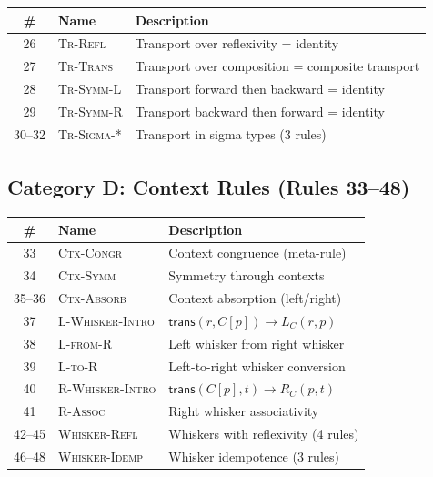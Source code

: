 \documentclass[manuscript]{BSLstyle}
\newcommand{\trans}{\mathsf{trans}}
\begin{document}
\begin{center}
\renewcommand{\arraystretch}{1.4}
\small
\begin{tabular}{clp{7cm}}
\toprule
\# & \textbf{Name} & \textbf{Description} \\
\midrule
26 & \textsc{Tr-Refl} & Transport over reflexivity = identity \\
27 & \textsc{Tr-Trans} & Transport over composition = composite transport \\
28 & \textsc{Tr-Symm-L} & Transport forward then backward = identity \\
29 & \textsc{Tr-Symm-R} & Transport backward then forward = identity \\
30--32 & \textsc{Tr-Sigma-*} & Transport in sigma types (3 rules) \\
\bottomrule
\end{tabular}
\end{center}

\subsection*{Category D: Context Rules (Rules 33--48)}

\begin{center}
\renewcommand{\arraystretch}{1.4}
\small
\begin{tabular}{clp{7cm}}
\toprule
\# & \textbf{Name} & \textbf{Description} \\
\midrule
33 & \textsc{Ctx-Congr} & Context congruence (meta-rule) \\
34 & \textsc{Ctx-Symm} & Symmetry through contexts \\
35--36 & \textsc{Ctx-Absorb} & Context absorption (left/right) \\
37 & \textsc{L-Whisker-Intro} & $\trans(r, C[p]) \to L_C(r, p)$ \\
38 & \textsc{L-from-R} & Left whisker from right whisker \\
39 & \textsc{L-to-R} & Left-to-right whisker conversion \\
40 & \textsc{R-Whisker-Intro} & $\trans(C[p], t) \to R_C(p, t)$ \\
41 & \textsc{R-Assoc} & Right whisker associativity \\
42--45 & \textsc{Whisker-Refl} & Whiskers with reflexivity (4 rules) \\
46--48 & \textsc{Whisker-Idemp} & Whisker idempotence (3 rules) \\
\bottomrule
\end{tabular}
\end{center}
\end{document}
